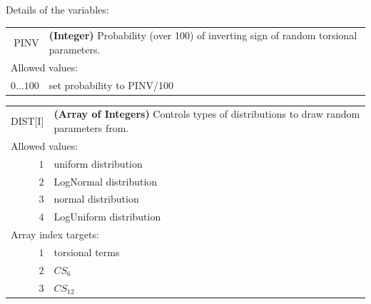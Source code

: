 \documentclass[10pt,a4paper]{report}
\numberwithin{equation}{section}
\begin{document}
\noindent Details of the variables:
\vspace{2ex}

{
\begin{tabular}{r@{ : }l}
\label{descr:pinv}
      PINV&\textbf{(Integer)} Probability (over 100) of inverting sign of random torsional parameters.                             \\ 
\multicolumn{2}{l}{Allowed values:} \\ 
    \(0 \ldots 100 \)&set probability to PINV/100                                                                          \\ 
\end{tabular}
\vspace{1ex}
}

{
\begin{tabular}{r@{ : }l}
\label{descr:dist}
      DIST[I]&\textbf{(Array of Integers)} Controls types of distributions to draw random parameters from.                                      \\ 
\multicolumn{2}{l}{Allowed values:} \\ 
     \(1\)&uniform distribution                                                                                 \\ 
\(2\)&LogNormal distribution                                                                                  \\ 
\(3\)&normal distribution                                                                              \\ 
\(4\)&LogUniform distribution                                                                              \\ 
\multicolumn{2}{l}{Array index targets:} \\ 
     \(1\)&torsional terms                                                                                      \\ 
     \(2\)&$CS_6$                                                                                               \\ 
     \(3\)&$CS_{12}$                                                                                            \\ 
\end{tabular}
\vspace{1ex}
}
\end{document}
